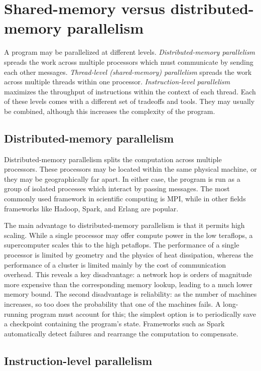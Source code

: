 \documentclass[conference, a4paper]{IEEEtran-modified}
\begin{document}
\section{Shared-memory versus distributed-memory parallelism}

    A program may be parallelized at different levels. \emph{Distributed-memory parallelism} spreads the work across multiple processors which must communicate by sending each other messages. \emph{Thread-level (shared-memory) parallelism} spreads the work across multiple threads within one processor. \emph{Instruction-level parallelism} maximizes the throughput of instructions within the context of each thread. Each of these levels comes with a different set of tradeoffs and tools. They may usually be combined, although this increases the complexity of the program.

\subsection{Distributed-memory parallelism}

    Distributed-memory parallelism splits the computation across multiple processors. These processors may be located within the same physical machine, or they may be geographically far apart. In either case, the program is run as a group of isolated processes which interact by passing messages. The most commonly used framework in scientific computing is MPI, while in other fields frameworks like Hadoop, Spark, and Erlang are popular.

    The main advantage to distributed-memory parallelism is that it permits high scaling. While a single processor may offer compute power in the low teraflops, a supercomputer scales this to the high petaflops. The performance of a single processor is limited by geometry and the physics of heat dissipation, whereas the performance of a cluster is limited mainly by the cost of communication overhead. This reveals a key disadvantage: a network hop is orders of magnitude more expensive than the corresponding memory lookup, leading to a much lower memory bound. The second disadvantage is reliability: as the number of machines increases, so too does the probability that one of the machines fails. A long-running program must account for this; the simplest option is to periodically save a checkpoint containing the program's state. Frameworks such as Spark automatically detect failures and rearrange the computation to compensate. 


\subsection{Instruction-level parallelism}
\end{document}
